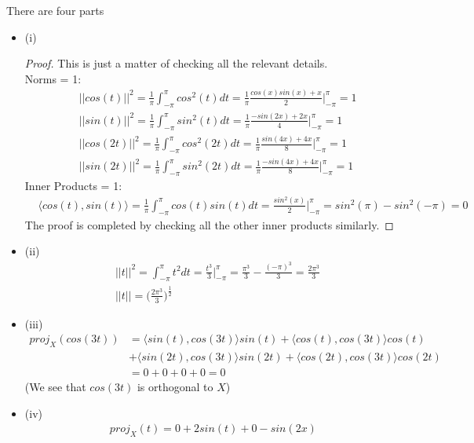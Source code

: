 \documentclass[12pt]{article}
\newenvironment{problem}[2][Problem]{\begin{trivlist}
\item[\hskip \labelsep {\bfseries #1}\hskip \labelsep {\bfseries #2.}]}{\end{trivlist}}
\theoremstyle{definition}
\theoremstyle{definition}
\theoremstyle{definition}
\theoremstyle{definition}
\begin{document}
\begin{problem}{3.8} There are four parts
\begin{itemize}
\item (i)
\begin{proof}
This is just a matter of checking all the relevant details. \\
Norms = 1:
\begin{align*}
&||cos(t)||^2 = \frac{1}{\pi} \int_{-\pi}^{\pi} cos^2(t) dt = \frac{1}{\pi}\frac{cos(x)sin(x) + x}{2} \big\vert^{\pi}_{-\pi} = 1 \\
&||sin(t)||^2 = \frac{1}{\pi} \int_{-\pi}^{\pi} sin^2(t) dt = \frac{1}{\pi}\frac{-sin(2x)+2x}{4} \big\vert^{\pi}_{-\pi} = 1 \\
&||cos(2t)||^2 = \frac{1}{\pi} \int_{-\pi}^{\pi} cos^2(2t) dt = \frac{1}{\pi}\frac{sin(4x)+4x}{8} \big\vert^{\pi}_{-\pi} = 1 \\
&||sin(2t)||^2 = \frac{1}{\pi} \int_{-\pi}^{\pi} sin^2(2t) dt = \frac{1}{\pi}\frac{-sin(4x)+4x}{8} \big\vert^{\pi}_{-\pi} = 1
\end{align*}
Inner Products = 1:
\begin{align*}
&\langle cos(t), sin(t) \rangle = \frac{1}{\pi} \int_{-\pi}^{\pi} cos(t)sin(t) dt = \frac{sin^2(x)}{2} \big\vert^{\pi}_{-\pi} = sin^2(\pi) - sin^2(-\pi) = 0 
\end{align*}
The proof is completed by checking all the other inner products similarly.
\end{proof}
\item (ii) 
\begin{align*}
&||t||^2 = \int_{-\pi}^{\pi} t^2 dt = \frac{t^3}{3} \big\vert^{\pi}_{-\pi} = \frac{\pi^3}{3} - \frac{(-\pi)^3}{3} = \frac{2\pi^3}{3} \\
&||t|| = \bigg( \frac{2\pi^3}{3} \bigg)^{\frac{1}{2}}
\end{align*}
\item(iii) 
\begin{align*}
proj_X(cos(3t)) &= \langle sin(t), cos(3t)\rangle sin(t) + \langle cos(t), cos(3t) \rangle cos(t) \\
&+ \langle sin(2t), cos(3t) \rangle sin(2t) + \langle cos(2t), cos(3t) \rangle cos(2t) \\
&= 0 + 0 + 0 + 0 = 0
\end{align*}
(We see that $cos(3t)$ is orthogonal to $X$)
\item (iv) 
\begin{align*}
proj_X(t) = 0 + 2sin(t) + 0 - sin(2x)
\end{align*}
\end{itemize}
\end{problem}
\end{document}
